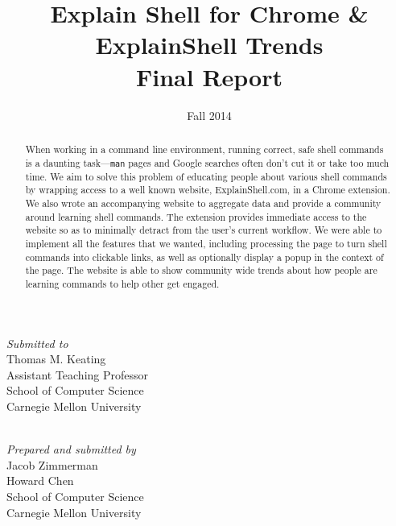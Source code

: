 \documentclass[11pt]{article}
\title{Explain Shell for Chrome \& ExplainShell Trends\\Final Report}
\author{}
\date{Fall 2014}
\begin{document}


\thispagestyle{empty}
\maketitle
\thispagestyle{empty}

\begin{center}
  \textit{Submitted to} \\
  Thomas M. Keating \\
  Assistant Teaching Professor \\
  School of Computer Science \\
  Carnegie Mellon University

  \mbox{} \\

  \textit{Prepared and submitted by} \\
  Jacob Zimmerman \\
  Howard Chen \\
  School of Computer Science \\
  Carnegie Mellon University

  \mbox{} \\
\end{center}

\begin{abstract}
  When working in a command line environment, running correct, safe shell
  commands is a daunting task---\texttt{man} pages and Google searches often
  don't cut it or take too much time. We aim to solve this problem of educating
  people about various shell commands by wrapping access to a well known
  website, ExplainShell.com, in a Chrome extension.  We also wrote an
  accompanying website to aggregate data and provide a community around learning
  shell commands. The extension provides immediate access to the website so as
  to minimally detract from the user's current workflow. We were able to
  implement all the features that we wanted, including processing the page to
  turn shell commands into clickable links, as well as optionally display a
  popup in the context of the page. The website is able to show community wide
  trends about how people are learning commands to help other get engaged.
\end{abstract}

\newpage
\end{document}
